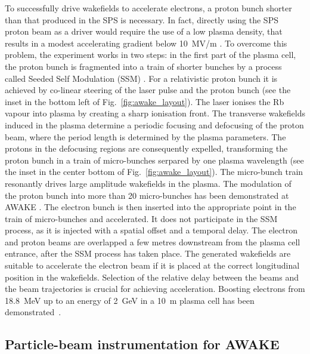 To successfully drive wakefields to accelerate electrons, a proton bunch shorter than that produced in the SPS is necessary. In fact, directly using the SPS proton beam as a driver would require the use of a low plasma density, that results in a modest accelerating gradient below 10~MV/m \cite{patric_AAC_seminar}. To overcome this problem, the experiment works in two steps: in the first part of the plasma cell, the proton bunch is fragmented into a train of shorter bunches by a process called Seeded Self Modulation (SSM) \cite{phys_self_modulation}. For a relativistic proton bunch \cite{PhysRevLett.104.255003} it is achieved by co-linear steering of the laser pulse and the proton bunch (see the inset in the bottom left of Fig.~\ref{fig:awake_layout}). The laser ionises the Rb vapour into plasma by creating a sharp ionisation front. The transverse wakefields induced in the plasma determine a periodic focusing and defocusing of the proton beam, where the period length is determined by the plasma parameters. The protons in the defocusing regions are consequently expelled, transforming the proton bunch in a train of micro-bunches serpared by one plasma wavelength (see the inset in the center bottom of Fig.~\ref{fig:awake_layout}). The micro-bunch train resonantly drives large amplitude wakefields in the plasma. The modulation of the proton bunch into more than 20 micro-bunches has been demonstrated at AWAKE \cite{PhysRevLett.122.054802}. The electron bunch is then inserted into the appropriate point in the train of micro-bunches and accelerated. It does not participate in the SSM process, as it is injected with a spatial offset and a temporal delay. The electron and proton beams are overlapped a few metres downstream from the plasma cell entrance, after the SSM process has taken place. The generated wakefields are suitable to accelerate the electron beam if it is placed at the correct longitudinal position in the wakefields. Selection of the relative delay between the beams and the beam trajectories is crucial for achieving acceleration. Boosting electrons from 18.8~MeV up to an energy of 2~GeV in a 10~m plasma cell has been demonstrated~\cite{Adli:2018end}.






\subsection[Particle-beam instrumentation for AWAKE]{Particle-beam instrumentation for AWAKE}\label{sec:AWAKE_instrumentation}

